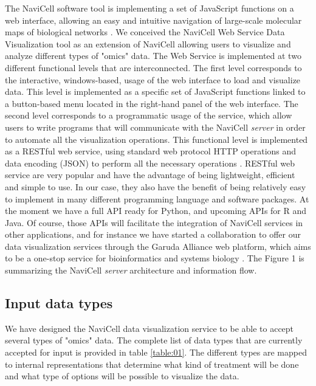 \documentclass[a4,center,fleqn]{NAR}
\begin{document}
The NaviCell software tool is implementing a set of JavaScript functions on a
web interface, allowing an easy and intuitive navigation of large-scale
molecular maps of biological networks \cite{kuperstein2013navicell}. We
conceived the NaviCell Web Service Data Visualization tool as an extension of
NaviCell allowing users to visualize and analyze different types of "omics"
data. The Web Service is implemented at two different functional levels that are
interconnected. The first level corresponds to the interactive, windows-based,
usage of the web interface to load and visualize data. This level is implemented
as a specific set of JavaScript functions linked to a button-based menu located
in the right-hand panel of the web interface. The second level corresponds to a
programmatic usage of the service, which allow users to write programs that will
communicate with the NaviCell \emph{server} in order to automate all the
visualization operations. This functional level is implemented as a RESTful web
service, using standard web protocol HTTP operations and data encoding (JSON)
to perform all the necessary operations \cite{fielding2002principled}.
RESTful web service are very popular and have the advantage of being
lightweight, efficient and simple to use. In our case, they also have the benefit of
being relatively easy to implement in many different programming language and
software packages. At the moment we have a full API ready for Python, and
upcoming APIs for R and Java. Of course, those APIs will facilitate the
integration of NaviCell services in other applications, and for instance we
have started a collaboration to offer our data visualization services through
the Garuda Alliance web platform, which aims to be a one-stop service for
bioinformatics and systems biology \cite{ghosh2011software}. The Figure 1 is
summarizing the NaviCell \emph{server} architecture and information flow.

\enlargethispage{-65.1pt}


\subsection{Input data types}

We have designed the NaviCell data visualization service to be able to accept
several types of "omics" data. The complete list of data types that are
currently accepted for input is provided in table \ref{table:01}. The different
types are mapped to internal representations that determine what kind of
treatment will be done and what type of options will be possible to visualize
the data.
\end{document}
